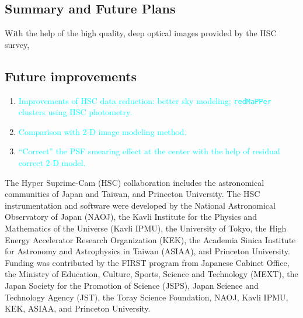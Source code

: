 \documentclass[preprint]{aastex}
\newcommand{\plan}[1]{\textcolor{cyan}{#1}}
\begin{document}
\begin{CJK*}{UTF8}{gbsn}
\section{Summary and Future Plans}

    With the help of the high quality, deep optical images provided by the 
    HSC survey, 

\subsection{Future improvements}

    \begin{enumerate}
        \item \plan{Improvements of HSC data reduction: better sky modeling; 
            \texttt{redMaPPer} clusters using HSC photometry.}
        \item \plan{Comparison with 2-D image modeling method.}
        \item \plan{``Correct'' the PSF smearing effect at the center with the help of 
            residual correct 2-D model.}
    \end{enumerate}

  
\acknowledgements
  The Hyper Suprime-Cam (HSC) collaboration includes the astronomical communities of Japan
  and Taiwan, and Princeton University.  The HSC instrumentation and software were
  developed by the National Astronomical Observatory of Japan (NAOJ), the Kavli Institute
  for the Physics and Mathematics of the Universe (Kavli IPMU), the University of Tokyo,
  the High Energy Accelerator Research Organization (KEK), the Academia Sinica Institute
  for Astronomy and Astrophysics in Taiwan (ASIAA), and Princeton University.  Funding was
  contributed by the FIRST program from Japanese Cabinet Office, the Ministry of
  Education, Culture, Sports, Science and Technology (MEXT), the Japan Society for the
  Promotion of Science (JSPS),  Japan Science and Technology Agency (JST),  the Toray
  Science  Foundation, NAOJ, Kavli IPMU, KEK, ASIAA,  and Princeton University.
   

\end{CJK*}
\end{document}
